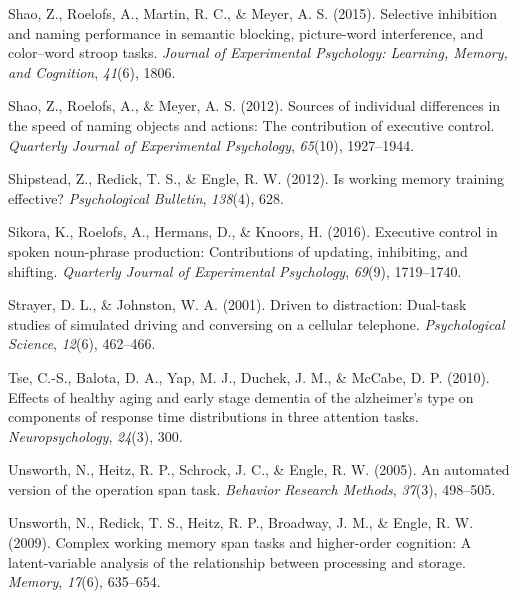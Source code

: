 \documentclass[
  man,floatsintext]{apa6}
\newlength{\cslhangindent}
\newlength{\cslentryspacingunit} %
\newenvironment{CSLReferences}[2] %
 {%
  \setlength{\parindent}{0pt}
  \ifodd #1
  \let\oldpar\par
  \def\par{\hangindent=\cslhangindent\oldpar}
  \fi
  \setlength{\parskip}{#2\cslentryspacingunit}
 }%
 {}
\begin{document}
\begin{CSLReferences}{1}{0}
\leavevmode{}%
Shao, Z., Roelofs, A., Martin, R. C., \& Meyer, A. S. (2015). Selective inhibition and naming performance in semantic blocking, picture-word interference, and color--word stroop tasks. \emph{Journal of Experimental Psychology: Learning, Memory, and Cognition}, \emph{41}(6), 1806.

\leavevmode{}%
Shao, Z., Roelofs, A., \& Meyer, A. S. (2012). Sources of individual differences in the speed of naming objects and actions: The contribution of executive control. \emph{Quarterly Journal of Experimental Psychology}, \emph{65}(10), 1927--1944.

\leavevmode{}%
Shipstead, Z., Redick, T. S., \& Engle, R. W. (2012). Is working memory training effective? \emph{Psychological Bulletin}, \emph{138}(4), 628.

\leavevmode{}%
Sikora, K., Roelofs, A., Hermans, D., \& Knoors, H. (2016). Executive control in spoken noun-phrase production: Contributions of updating, inhibiting, and shifting. \emph{Quarterly Journal of Experimental Psychology}, \emph{69}(9), 1719--1740.

\leavevmode{}%
Strayer, D. L., \& Johnston, W. A. (2001). Driven to distraction: Dual-task studies of simulated driving and conversing on a cellular telephone. \emph{Psychological Science}, \emph{12}(6), 462--466.

\leavevmode{}%
Tse, C.-S., Balota, D. A., Yap, M. J., Duchek, J. M., \& McCabe, D. P. (2010). Effects of healthy aging and early stage dementia of the alzheimer's type on components of response time distributions in three attention tasks. \emph{Neuropsychology}, \emph{24}(3), 300.

\leavevmode{}%
Unsworth, N., Heitz, R. P., Schrock, J. C., \& Engle, R. W. (2005). An automated version of the operation span task. \emph{Behavior Research Methods}, \emph{37}(3), 498--505.

\leavevmode{}%
Unsworth, N., Redick, T. S., Heitz, R. P., Broadway, J. M., \& Engle, R. W. (2009). Complex working memory span tasks and higher-order cognition: A latent-variable analysis of the relationship between processing and storage. \emph{Memory}, \emph{17}(6), 635--654.


\end{CSLReferences}
\end{document}
